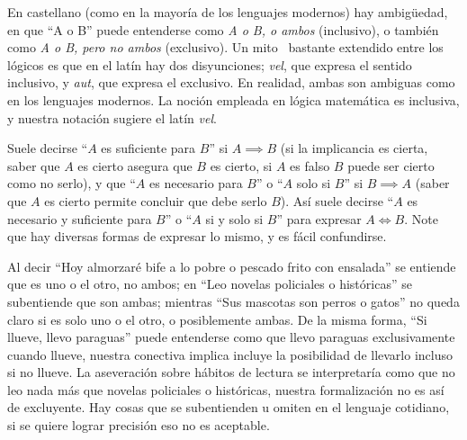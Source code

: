   En castellano
  (como en la mayoría de los lenguajes modernos)
  hay ambigüedad,
  en que ``A o B'' puede entenderse como \emph{A o B, o ambos}
  (inclusivo),%
  o también como \emph{A o B, pero no ambos}
  (exclusivo).%
  Un mito~%
    \cite{sep-disjunction}
  bastante extendido entre los lógicos
  es que en el latín hay dos disyunciones;
  \emph{\foreignlanguage{latin}{vel}},
  que expresa el sentido inclusivo,
  y \emph{\foreignlanguage{latin}{aut}},
  que expresa el exclusivo.
  En realidad,
  ambas son ambiguas como en los lenguajes modernos.
  La noción empleada en lógica matemática es inclusiva,
  y nuestra notación
  sugiere el latín \emph{\foreignlanguage{latin}{vel}}.

  Suele decirse ``\(A\) es suficiente para \(B\)''%
  si \(A \implies B\)
  (si la implicancia es cierta,
   saber que \(A\) es cierto asegura que \(B\) es cierto,
   si \(A\) es falso \(B\) puede ser cierto como no serlo),
  y que ``\(A\) es necesario para \(B\)''%
  o ``\(A\) solo si \(B\)''%
  si \(B \implies A\)
  (saber que \(A\) es cierto permite concluir que debe serlo \(B\)).
  Así suele decirse ``\(A\) es necesario y suficiente para \(B\)''
  o ``\(A\) si y solo si \(B\)''%
  para expresar \(A \iff B\).
  Note que hay diversas formas de expresar lo mismo,
  y es fácil confundirse.

  Al decir ``Hoy almorzaré bife a lo pobre o pescado frito con ensalada''
  se entiende que es uno o el otro, no ambos;
  en ``Leo novelas policiales o históricas''
  se subentiende que son ambas;
  mientras ``Sus mascotas son perros o gatos''
  no queda claro si es solo uno o el otro,
  o posiblemente ambas.
  De la misma forma,
  ``Si llueve, llevo paraguas''
  puede entenderse
  como que llevo paraguas exclusivamente cuando llueve,
  nuestra conectiva implica incluye la posibilidad de llevarlo
  incluso si no llueve.
  La aseveración sobre hábitos de lectura
  se interpretaría como que no leo nada más
  que novelas policiales o históricas,
  nuestra formalización no es así de excluyente.
  Hay cosas que se subentienden u omiten
  en el lenguaje cotidiano,
  si se quiere lograr precisión eso no es aceptable.

